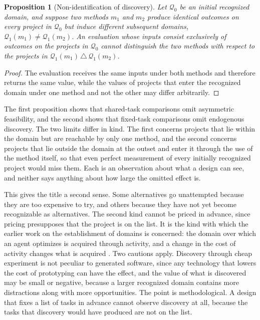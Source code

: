 \documentclass[11pt]{article}
\newtheorem{proposition}{Proposition}
\theoremstyle{remark}
\newcommand{\Q}{\mathcal{Q}}
\begin{document}
\begin{proposition}[Non-identification of discovery]
Let $\Q_0$ be an initial recognized domain, and suppose two methods $m_1$ and $m_2$ produce identical outcomes on every project in $\Q_0$ but induce different subsequent domains, $\Q_1(m_1)\neq\Q_1(m_2)$. An evaluation whose inputs consist exclusively of outcomes on the projects in $\Q_0$ cannot distinguish the two methods with respect to the projects in $\Q_1(m_1)\,\triangle\,\Q_1(m_2)$.
\end{proposition}

\begin{proof}
The evaluation receives the same inputs under both methods and therefore returns the same value, while the values of projects that enter the recognized domain under one method and not the other may differ arbitrarily.
\end{proof}

The first proposition shows that shared-task comparisons omit asymmetric feasibility, and the second shows that fixed-task comparisons omit endogenous discovery. The two limits differ in kind. The first concerns projects that lie within the domain but are reachable by only one method, and the second concerns projects that lie outside the domain at the outset and enter it through the use of the method itself, so that even perfect measurement of every initially recognized project would miss them. Each is an observation about what a design can see, and neither says anything about how large the omitted effect is.

This gives the title a second sense. Some alternatives go unattempted because they are too expensive to try, and others because they have not yet become recognizable as alternatives. The second kind cannot be priced in advance, since pricing presupposes that the project is on the list. It is the kind with which the earlier work on the establishment of domains is concerned: the domain over which an agent optimizes is acquired through activity, and a change in the cost of activity changes what is acquired \cite{flyxion_domain}. Two cautions apply. Discovery through cheap experiment is not peculiar to generated software, since any technology that lowers the cost of prototyping can have the effect, and the value of what is discovered may be small or negative, because a larger recognized domain contains more distractions along with more opportunities. The point is methodological. A design that fixes a list of tasks in advance cannot observe discovery at all, because the tasks that discovery would have produced are not on the list.
\end{document}
